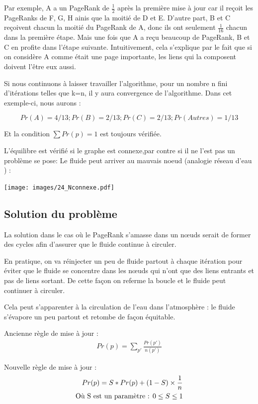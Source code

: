Par exemple, A a un PageRank de $\frac{1}{2}$ après la première mise à
jour car il reçoit les PageRanks de F, G, H ainis que la moitié de D et
E. D'autre part, B et C reçoivent chacun la moitié du PageRank de A,
donc ils ont seulement $\frac{1}{16}$ chacun dans la première étape.
Mais une fois que A a reçu beaucoup de PageRank, B et C en profite dans
l'étape suivante. Intuitivement, cela s'explique par le fait que si on
considère A comme était une page importante, les liens qui la composent
doivent l'être eux aussi.

 Si nous continuons à laisser travailler l'algorithme, pour un nombre n fini d'itérations telles que k=n, il y aura convergence de l'algorithme. Dans cet exemple-ci,  nous aurons :

	$$Pr(A) = 4/13 ; Pr(B) = 2/13 ; Pr(C) = 2/13 ; Pr(Autres) = 1/13$$
 
Et la condition $\sum Pr(p) = 1$ est toujours vérifiée.
 
 L'équilibre est vérifié si le graphe est connexe,par contre si il ne l'est pas un problème se pose: Le fluide peut arriver au mauvais noeud (analogie réseau d'eau )  :

\texttt{[image: images/24\_Nconnexe.pdf]}

\subsection*{Solution du problème}
	La solution dans le cas où le PageRank s'amasse dans un nœuds serait de former des cycles afin d'assurer que le fluide continue à circuler.
	
 	En pratique, on va réinjecter un peu de fluide partout à chaque itération pour éviter que le fluide se concentre dans les nœuds qui n'ont que des liens entrants et pas de liens sortant. De cette façon on referme la boucle et le fluide peut continuer à circuler.
 	
 	Cela peut s'apparenter à la circulation de l'eau dans l'atmosphère : le fluide s'évapore un peu partout et retombe de façon équitable.

	Ancienne règle de mise à jour :
	\begin{align*}
	Pr(p) =  \sum_ {p'}\frac{Pr(p')}{n(p')}
	\end{align*}
	
 	Nouvelle règle de mise à jour : \\
	\begin{align*}
         Pr(p) = S*Pr(p) + (1-S)  \times \frac{1}{n} \\
	 \text{Où S est un paramètre : $ 0 \le S \le 1 $} 
	\end{align*}
        
